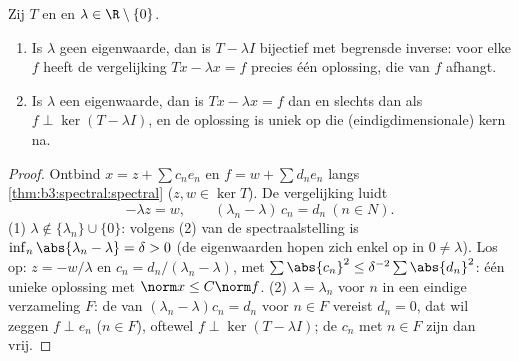 \begin{theorem}
\label{thm:b3:spectral:fredholm}
Zij $T$  en  en $\lambda \in
\R\setminus\{0\}$.
\begin{enumerate}
  \item Is $\lambda$ geen eigenwaarde, dan is $T - \lambda I$
        bijectief met begrensde inverse: voor elke $f$ heeft de
        vergelijking $Tx - \lambda x = f$ precies één oplossing,
        die  van $f$ afhangt.
  \item Is $\lambda$ een eigenwaarde, dan is $Tx - \lambda x = f$
         dan en slechts dan als $f \perp \ker(T -
        \lambda I)$, en de oplossing is uniek op die
        (eindigdimensionale) kern na.
\end{enumerate}
\end{theorem}

\begin{proof}
Ontbind $x = z + \sum c_ne_n$ en $f = w + \sum d_ne_n$ langs
\cref{thm:b3:spectral:spectral} ($z, w \in \ker T$). De
vergelijking luidt
\[
-\lambda z = w, \qquad (\lambda_n - \lambda)\,c_n = d_n\
(n \in N).
\]
(1) $\lambda \notin \{\lambda_n\}\cup\{0\}$: volgens (2) van de
spectraalstelling is $\inf_n\abs{\lambda_n - \lambda} = \delta >
0$ (de eigenwaarden hopen zich enkel op in $0 \neq \lambda$). Los
op: $z = -w/\lambda$ en $c_n = d_n/(\lambda_n - \lambda)$, met
$\sum\abs{c_n}^2 \leq \delta^{-2}\sum\abs{d_n}^2$: één unieke
oplossing met $\norm x \leq C\norm f$.
(2) $\lambda = \lambda_{n}$ voor $n$ in een eindige verzameling
$F$: de  van $(\lambda_n - \lambda)c_n = d_n$ voor
$n \in F$ vereist $d_n = 0$, dat wil zeggen $f \perp e_n$ ($n \in
F$), oftewel $f \perp \ker(T - \lambda I)$; de $c_n$ met $n \in
F$ zijn dan vrij.
\end{proof}

